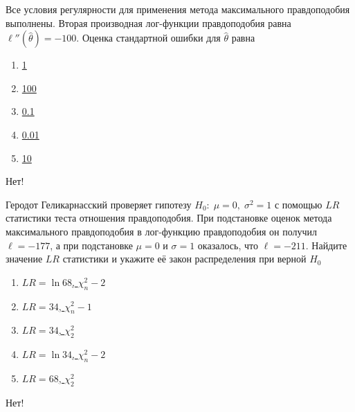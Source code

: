 \documentclass[t]{beamer}
\begin{document}
 \begin{frame} \label{49-No} 
\begin{block}{49} 

Все условия регулярности для применения метода максимального правдоподобия выполнены. Вторая производная лог-функции правдоподобия равна $\ell''(\hat{\theta})=-100$. Оценка стандартной ошибки для $\hat{\theta}$ равна
 


 \end{block} 
\begin{enumerate} 
\item[] \hyperlink{49-No}{\beamergotobutton{} 1}
\item[] \hyperlink{49-No}{\beamergotobutton{} 100}
\item[] \hyperlink{49-Yes}{\beamergotobutton{} 0.1}
\item[] \hyperlink{49-No}{\beamergotobutton{} 0.01}
\item[] \hyperlink{49-No}{\beamergotobutton{} 10}
\end{enumerate} 

 \alert{Нет!} 
\end{frame} 


 \begin{frame} \label{50-No} 
\begin{block}{50} 

Геродот Геликарнасский проверяет гипотезу $H_0: \; \mu=0, \; \sigma^2=1$ с помощью $LR$ статистики теста отношения правдоподобия. При подстановке оценок метода максимального правдоподобия в лог-функцию правдоподобия он получил $\ell=-177$, а при подстановке $\mu=0$ и $\sigma=1$ оказалось, что $\ell=-211$. Найдите значение $LR$ статистики и укажите её закон распределения при верной $H_0$
 


 \end{block} 
\begin{enumerate} 
\item[] \hyperlink{50-No}{\beamergotobutton{} $LR=\ln 68$, $\chi^2_n-2$}
\item[] \hyperlink{50-No}{\beamergotobutton{} $LR=34$, $\chi^2_n-1$}
\item[] \hyperlink{50-No}{\beamergotobutton{} $LR=34$, $\chi^2_2$}
\item[] \hyperlink{50-No}{\beamergotobutton{} $LR=\ln 34$, $\chi^2_n-2$}
\item[] \hyperlink{50-Yes}{\beamergotobutton{} $LR=68$, $\chi^2_2$}
\end{enumerate} 

 \alert{Нет!} 
\end{frame} 
\end{document}
